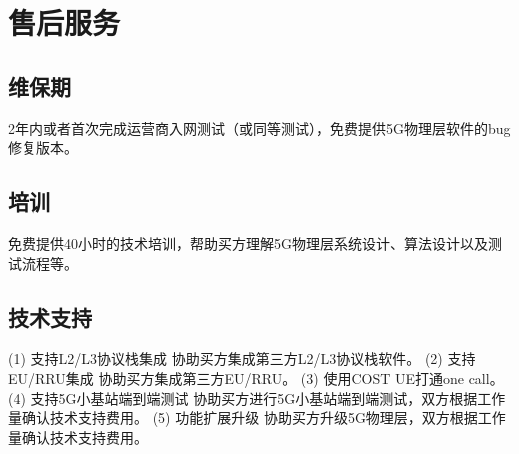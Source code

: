 \newpage
\section{售后服务}
\subsection{维保期}

2年内或者首次完成运营商入网测试（或同等测试），免费提供5G物理层软件的bug修复版本。\\

\subsection{培训}
免费提供40小时的技术培训，帮助买方理解5G物理层系统设计、算法设计以及测试流程等。

\subsection{技术支持}
(1) 支持L2/L3协议栈集成
\newline
\setlength{\hangindent}{2em}
协助买方集成第三方L2/L3协议栈软件。
\newline
(2) 支持EU/RRU集成
\newline
\setlength{\hangindent}{2em}
协助买方集成第三方EU/RRU。
\newline
\setlength{\hangindent}{2em}
(3) 使用COST UE打通one call。
\newline
\setlength{\hangindent}{2em}
(4) 支持5G小基站端到端测试
\newline
\setlength{\hangindent}{2em}
协助买方进行5G小基站端到端测试，双方根据工作量确认技术支持费用。
(5) 功能扩展升级
\newline
\setlength{\hangindent}{2em}
协助买方升级5G物理层，双方根据工作量确认技术支持费用。

\newpage